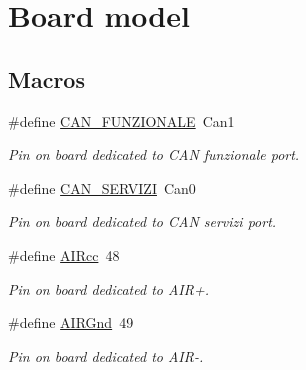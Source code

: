 \hypertarget{group___board__model__group}{}\section{Board model}
\label{group___board__model__group}
\subsection*{Macros}
\begin{DoxyCompactItemize}
\item 
\mbox{\label{group___board__model__group_gaea8caf3e051442ba02c4e44a59602796}} 
\#define \mbox{\hyperlink{group___board__model__group_gaea8caf3e051442ba02c4e44a59602796}{C\+A\+N\+\_\+\+F\+U\+N\+Z\+I\+O\+N\+A\+LE}}~Can1
\begin{DoxyCompactList}\small\item\em Pin on board dedicated to C\+AN funzionale port. \end{DoxyCompactList}\item 
\mbox{\label{group___board__model__group_ga8d2f70cd4c07aafe94fd9944121922d9}} 
\#define \mbox{\hyperlink{group___board__model__group_ga8d2f70cd4c07aafe94fd9944121922d9}{C\+A\+N\+\_\+\+S\+E\+R\+V\+I\+ZI}}~Can0
\begin{DoxyCompactList}\small\item\em Pin on board dedicated to C\+AN servizi port. \end{DoxyCompactList}\item 
\mbox{\label{group___board__model__group_ga15003800bba3fb64e770c6a920613419}} 
\#define \mbox{\hyperlink{group___board__model__group_ga15003800bba3fb64e770c6a920613419}{A\+I\+Rcc}}~48
\begin{DoxyCompactList}\small\item\em Pin on board dedicated to A\+I\+R+. \end{DoxyCompactList}\item 
\mbox{\label{group___board__model__group_gab421578437964f5c645163739a0803e7}} 
\#define \mbox{\hyperlink{group___board__model__group_gab421578437964f5c645163739a0803e7}{A\+I\+R\+Gnd}}~49
\begin{DoxyCompactList}\small\item\em Pin on board dedicated to A\+I\+R-\/. \end{DoxyCompactList}\item 

\end{DoxyCompactItemize}
